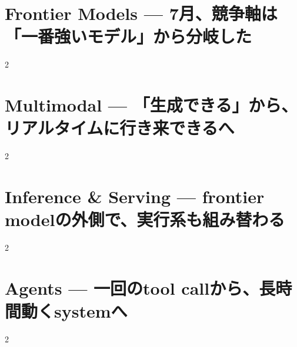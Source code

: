 \documentclass[lualatex,a4paper,11pt]{jlreq}
\begin{document}
\surveycover
\clearpage


\clearpage
\section{Frontier Models — 7月、競争軸は「一番強いモデル」から分岐した}
\label{pkg:frontier-models-july}
\vspace{0.15em}
\begin{multicols}{2}

\end{multicols}
\Needspace{0.34\textheight}

\medskip


\clearpage
\section{Multimodal — 「生成できる」から、リアルタイムに行き来できるへ}
\label{pkg:multimodal-july}
\vspace{0.15em}
\begin{multicols}{2}

\end{multicols}
\Needspace{0.34\textheight}

\medskip


\clearpage
\section{Inference \& Serving — frontier modelの外側で、実行系も組み替わる}
\label{pkg:inference-serving-july}
\vspace{0.15em}
\begin{multicols}{2}

\end{multicols}
\Needspace{0.34\textheight}

\medskip


\clearpage
\section{Agents — 一回のtool callから、長時間動くsystemへ}
\label{pkg:agents-july}
\vspace{0.15em}
\begin{multicols}{2}

\end{multicols}
\Needspace{0.34\textheight}

\medskip

\end{document}
